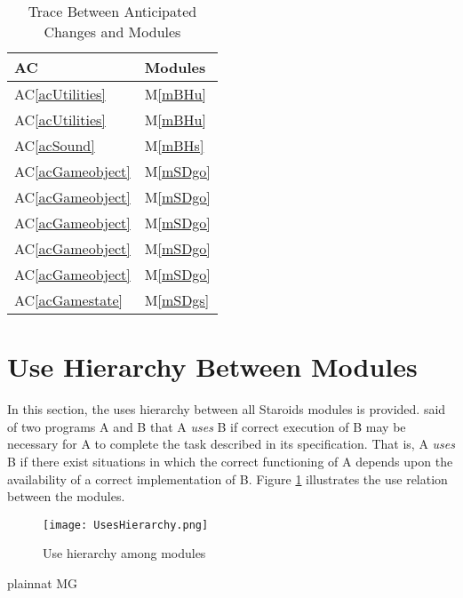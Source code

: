 \documentclass[12pt, titlepage]{article}
\newcommand{\acref}[1]{AC\ref{#1}}
\newcommand{\mref}[1]{M\ref{#1}}
\begin{document}
\begin{table}[H]
\centering
\begin{tabular}{p{} p{}}
\toprule
\textbf{AC} & \textbf{Modules}\\
\midrule
\acref{acUtilities} & \mref{mBHu}\\
\acref{acUtilities} & \mref{mBHu}\\
\acref{acSound} & \mref{mBHs}\\
\acref{acGameobject} & \mref{mSDgo}\\
\acref{acGameobject} & \mref{mSDgo}\\
\acref{acGameobject} & \mref{mSDgo}\\
\acref{acGameobject} & \mref{mSDgo}\\
\acref{acGameobject} & \mref{mSDgo}\\
\acref{acGamestate} & \mref{mSDgs}\\
\bottomrule
\end{tabular}
\caption{Trace Between Anticipated Changes and Modules}
\label{TblACT}
\end{table}

\section{Use Hierarchy Between Modules} \label{SecUse}

In this section, the uses hierarchy between all Staroids modules is provided. \citet{Parnas1978} said of two programs A and B that A {\em uses} B if correct execution of B may be necessary for A to complete the task described in its specification. That is, A {\em uses} B if there exist situations in which the correct functioning of A depends upon the availability of a correct implementation of B.  Figure \ref{FigUH} illustrates the use relation between the modules.


\begin{figure}[H]
\centering
\texttt{[image: UsesHierarchy.png]}
\caption{Use hierarchy among modules}
\label{FigUH}
\end{figure}


 {plainnat}
 {MG}
\end{document}
